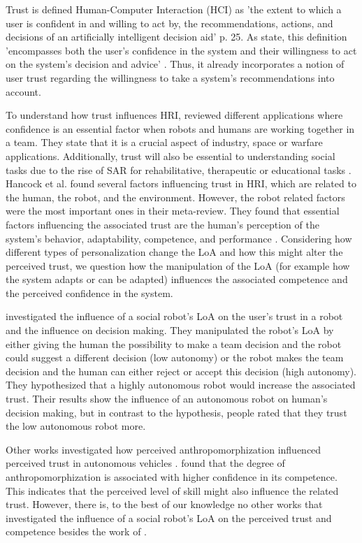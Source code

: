 Trust is defined Human-Computer Interaction (HCI) as 'the extent to which a user is confident in and willing to act by, the recommendations, actions, and decisions of an artificially intelligent decision aid' \textcite{mcallister1995affect} p. 25. As \textcite{madsen2000measuring} state, this definition  'encompasses both the user's confidence in the system and their willingness to act on the system's decision and advice' \cite[1]{madsen2000measuring}. Thus, it already incorporates a notion of user trust regarding the willingness to take a system's recommendations into account.

To understand how trust influences HRI, \textcite{hancock2011meta} reviewed different applications where confidence is an essential factor when robots and humans are working together in a team. They state that it is a crucial aspect of industry, space or warfare applications. Additionally, trust will also be essential to understanding social tasks due to the rise of SAR for rehabilitative, therapeutic or educational tasks \cite{corry,fasola2013socially}. Hancock et al. found several factors influencing trust in HRI, which are related to the human, the robot, and the environment. However, the robot related factors were the most important ones in their meta-review. They found that essential factors influencing the associated trust are the human's perception of the system's behavior, adaptability, competence, and performance \cite{hancock2011meta}.
Considering how different types of personalization change the LoA and how this might alter the perceived trust, we question how the manipulation of the LoA (for example how the system adapts or can be adapted) influences the associated competence and the perceived confidence in the system.

\textcite{rau2013effects} investigated the influence of a social robot's LoA on the user's trust in a robot and the influence on decision making. They manipulated the robot's LoA by either giving the human the possibility to make a team decision and the robot could suggest a different decision (low autonomy) or the robot makes the team decision and the human can either reject or accept this decision (high autonomy). They hypothesized that a highly autonomous robot would increase the associated trust. Their results show the influence of an autonomous robot on human's decision making, but in contrast to the hypothesis, people rated that they trust the low autonomous robot more. 

Other works investigated how perceived anthropomorphization influenced perceived trust in autonomous vehicles \textcite{waytz2014mind}. \textcite{waytz2014mind} found that the degree of anthropomorphization is associated with higher confidence in its competence. This indicates that the perceived level of skill might also influence the related trust. However, there is, to the best of our knowledge no other works that investigated the influence of a social robot's LoA on the perceived trust and competence besides the work of \textcite{rau2013effects}.

